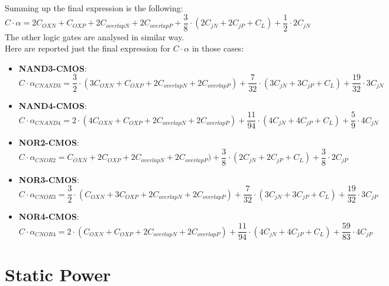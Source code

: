\documentclass[12pt,  english, makeidx, a4paper, titlepage, oneside]{article}
\begin{document}
Summing up the final expression is the following:
\begin{equation}
	C \cdot \alpha =  2C_{OXN} + C_{OXP} + 2C_{overlapN}+ 2C_{overlapP} +\frac{3}{8} \cdot (2C_{jN} + 2C_{jP}+C_L) +\frac{1}{2} \cdot 2C_{jN}
\end{equation}
The other logic gates are analysed in similar way.\\
Here are reported just the final expression for $ C \cdot \alpha $ in those cases:
\begin{itemize}
	\item  \textbf{NAND3-CMOS}: 
	\begin{equation}
	C \cdot \alpha_{CNAND3} = \frac{3}{2} \cdot (3C_{OXN} + C_{OXP} + 2C_{overlapN}+ 2C_{overlapP} )+\frac{7}{32} \cdot (3C_{jN} + 3C_{jP}+C_L) +\frac{19}{32} \cdot 3C_{jN} 
	\end{equation}
	\item  \textbf{NAND4-CMOS}:
		\begin{equation}
	C \cdot \alpha_{CNAND4} = 2 \cdot (4C_{OXN} + C_{OXP} + 2C_{overlapN}+ 2C_{overlapP} )+\frac{11}{94} \cdot (4C_{jN} + 4C_{jP}+C_L) +\frac{5}{9} \cdot 4C_{jN}
		\end{equation}
	\item  \textbf{NOR2-CMOS}:
				\begin{equation}
			C \cdot \alpha_{CNOR2} = C_{OXN} + 2C_{OXP} + 2C_{overlapN}+ 2C_{overlapP} )+\frac{3}{8} \cdot (2C_{jN} + 2C_{jP}+C_L) +\frac{3}{8} \cdot 2C_{jP}
			\end{equation}
	\item  \textbf{NOR3-CMOS}:
				\begin{equation}
				C \cdot \alpha_{CNOR3} =\frac{3}{2} \cdot (C_{OXN} + 3C_{OXP} + 2C_{overlapN}+ 2C_{overlapP} )+\frac{7}{32} \cdot (3C_{jN} + 3C_{jP}+C_L) +\frac{19}{32} \cdot 3C_{jP}
				\end{equation}
		\item  \textbf{NOR4-CMOS}:
					\begin{equation}
					C \cdot \alpha_{CNOR4} =2 \cdot (C_{OXN} + C_{OXP} + 2C_{overlapN}+ 2C_{overlapP} )+\frac{11}{94} \cdot (4C_{jN} + 4C_{jP}+C_L) +\frac{59}{83} \cdot 4C_{jP} 
					\end{equation}	
\end{itemize}


\newpage

\section{Static Power}
\end{document}

